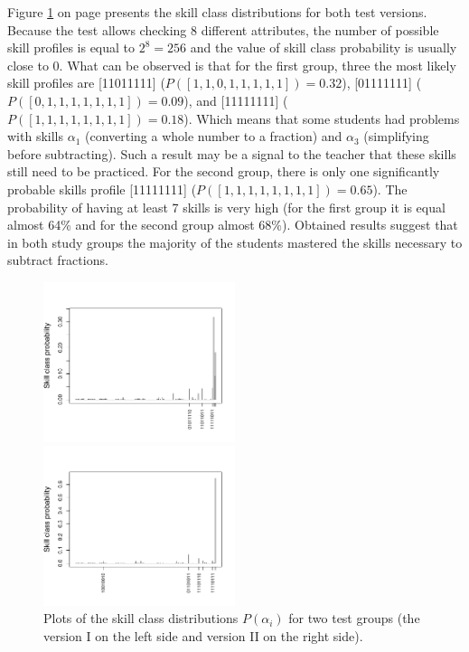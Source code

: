 \documentclass[english]{pwr_wmat_praca_dyplomowa}
\theoremstyle{plain}
\numberwithin{theorem}{chapter}
\theoremstyle{definition}
\numberwithin{theorem}{chapter}
\begin{document}
	Figure \ref{skill_class_dist_groups} on page \pageref{skill_class_dist_groups} presents the skill class distributions for both test versions. Because the test allows checking 8 different attributes, the number of possible skill profiles is equal to $2^8 = 256$ and the value of skill class probability is usually close to 0. What can be observed is that for the first group, three the most likely skill profiles are [11011111] ($P([1,1,0,1,1,1,1,1])=0.32$), [01111111] ($P([0,1,1,1,1,1,1,1])=0.09$), and [11111111] ($P([1,1,1,1,1,1,1,1])=0.18$). Which means that some students had problems with skills $\alpha_1$ (converting a whole number to a fraction) and $\alpha_3$ (simplifying before subtracting). Such a result may be a signal to the teacher that these skills still need to be practiced. For the second group, there is only one significantly probable skills profile [11111111] ($P([1,1,1,1,1,1,1,1])=0.65$). The probability of having at least 7 skills is very high (for the first group it is equal almost 64\% and for the second group almost 68\%). Obtained results suggest that in both study groups the majority of the students mastered the skills necessary to subtract fractions.
	
	\begin{figure}[hb!]
		\centering
		\begin{multicols}{2}
			\includegraphics[width=0.5\textwidth]{Skill_class_probability_1.pdf}
			
			\includegraphics[width=0.5\textwidth]{Skill_class_probability_2.pdf}
		\end{multicols} 
		\caption{Plots of the skill class distributions $P(\alpha_i)$ for two test groups (the version I on the left side and version II on the right side).}\label{skill_class_dist_groups}
	\end{figure}
	
\end{document}
